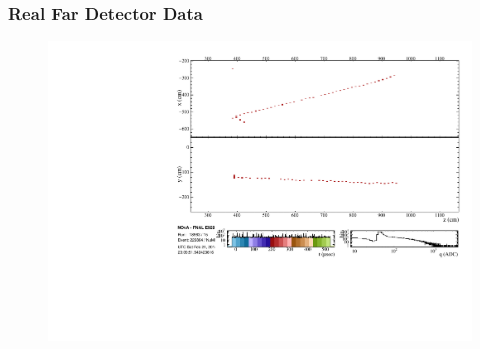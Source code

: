 \documentclass[10pt,professionalfonts,xcolor=table]{beamer}
\begin{document}
\frame
{
  \frametitle{Real Far Detector Data}

 \begin{figure} \includegraphics[height=0.9\textwidth, angle=-90]{figures/evd_steps/evd_oneslicehit.pdf} \end{figure}
}
\end{document}
